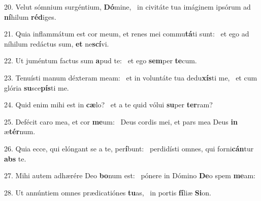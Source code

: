 20. Velut sómnium surgéntium, \textbf{Dó}mine, \ast\  in civitáte tua imáginem ipsórum ad \textbf{ní}hilum \textbf{réd}iges.\

21. Quia inflammátum est cor meum, et renes mei commu\textbf{tá}ti sunt: \ast\  et ego ad níhilum redáctus sum, \textbf{et} ne\textbf{scí}vi.\

22. Ut juméntum factus sum \textbf{a}pud te: \ast\  et ego \textbf{sem}per \textbf{te}cum.\

23. Tenuísti manum déxteram meam: \dag\  et in voluntáte tua dedu\textbf{xís}ti me, \ast\  et cum glória \textbf{su}sce\textbf{pís}ti me.\

24. Quid enim mihi est in \textbf{cæ}lo? \ast\  et a te quid vólui \textbf{su}per \textbf{ter}ram?\

25. Defécit caro mea, et cor \textbf{me}um: \ast\  Deus cordis mei, et pars mea Deus \textbf{in} æ\textbf{tér}num.\

26. Quia ecce, qui elóngant se a te, per\textbf{í}bunt: \ast\  perdidísti omnes, qui forni\textbf{cán}tur \textbf{abs} te.\

27. Mihi autem adhærére Deo \textbf{bo}num est: \ast\  pónere in Dómino \textbf{De}o spem \textbf{me}am:\

28. Ut annúntiem omnes prædicatiónes \textbf{tu}as, \ast\  in portis \textbf{fí}liæ \textbf{Si}on.\

